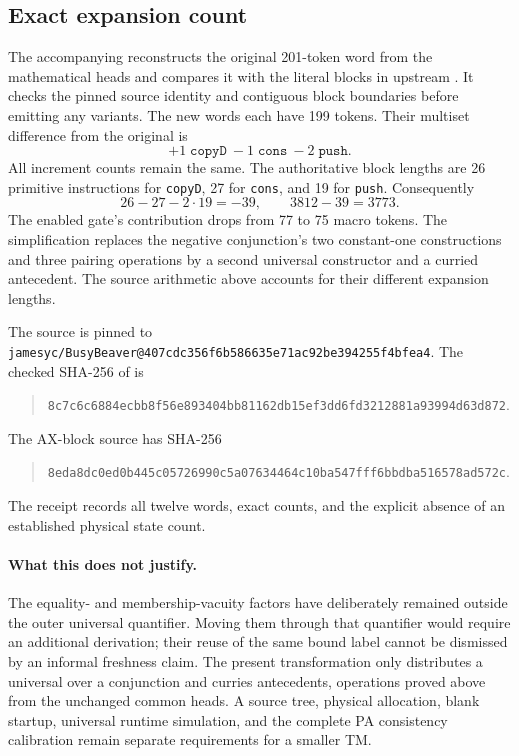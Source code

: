 \subsection{Exact expansion count}

The accompanying  reconstructs the original
201-token word from the mathematical heads and compares it with the
literal blocks in upstream . It checks
the pinned source identity and contiguous block boundaries before
emitting any variants. The new words each have 199 tokens. Their
multiset difference from the original is
\[
  +1\;\texttt{copyD}\ -1\;\texttt{cons}\ -2\;\texttt{push}.
\]
All increment counts remain the same. The authoritative block lengths
are 26 primitive instructions for \texttt{copyD}, 27 for
\texttt{cons}, and 19 for \texttt{push}. Consequently
\[
  26-27-2\cdot19=-39,
  \qquad 3812-39=3773.
\]
The enabled gate's contribution drops from 77 to 75 macro tokens.
The simplification replaces the negative conjunction's two constant-one
constructions and three pairing operations by a second universal
constructor and a curried antecedent. The source arithmetic above
accounts for their different expansion lengths.

The source is pinned to
\nolinkurl{jamesyc/BusyBeaver@407cdc356f6b586635e71ac92be394255f4bfea4}.
The checked SHA-256 of  is
\begin{quote}\small
\nolinkurl{8c7c6c6884ecbb8f56e893404bb81162db15ef3dd6fd3212881a93994d63d872}.
\end{quote}
The AX-block source has SHA-256
\begin{quote}\small
\nolinkurl{8eda8dc0ed0b445c05726990c5a07634464c10ba547fff6bbdba516578ad572c}.
\end{quote}
The receipt records all twelve words, exact counts, and the explicit
absence of an established physical state count.

\paragraph{What this does not justify.}
The equality- and membership-vacuity factors have deliberately remained
outside the outer universal quantifier. Moving them through that
quantifier would require an additional derivation; their reuse of the
same bound label cannot be dismissed by an informal freshness claim.
The present transformation only distributes a universal over a
conjunction and curries antecedents, operations proved above from the
unchanged common heads. A source tree, physical allocation, blank
startup, universal runtime simulation, and the complete PA consistency
calibration remain separate requirements for a smaller TM.

\endgroup
